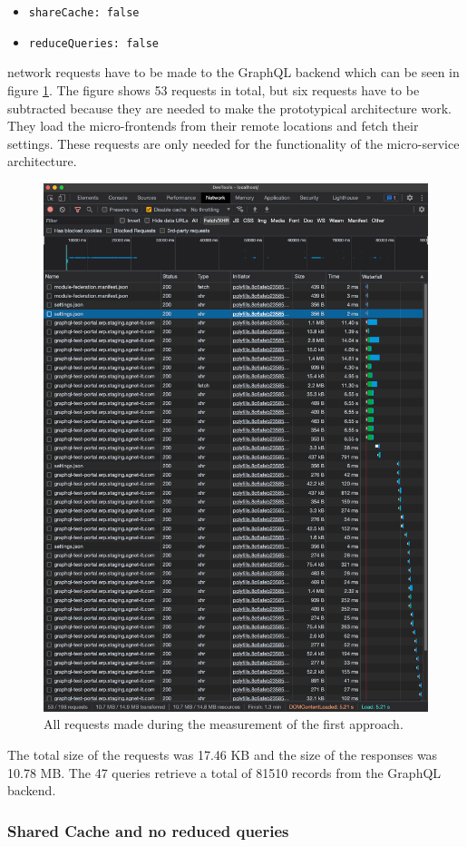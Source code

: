 \begin{itemize}
  \item \texttt{shareCache: false}
  \item \texttt{reduceQueries: false}
\end{itemize}

 network requests have to be made to the GraphQL backend which can be seen in figure \ref{fig:results:no-shared-cache-no-reduction}. The figure shows 53 requests in total, but six requests have to be subtracted because they are needed to make the prototypical architecture work. They load the micro-frontends from their remote locations and fetch their settings. These requests are only needed for the functionality of the micro-service architecture.

\ifshowImages
\begin{figure}[H]
\centering
\includegraphics[width=0.6\linewidth]{images/results/1-attempt/no-shared-cache-no-reduction.png}
\caption{All requests made during the measurement of the first approach.}\label{fig:results:no-shared-cache-no-reduction}
\end{figure}
\fi

\noindent The total size of the requests was 17.46 KB and the size of the responses was 10.78 MB. The 47 queries retrieve a total of 81510 records from the GraphQL backend.

\subsubsection{Shared Cache and no reduced queries}\label{subsubsection:results:performance-measurement:shared-cache-no-reduction}

